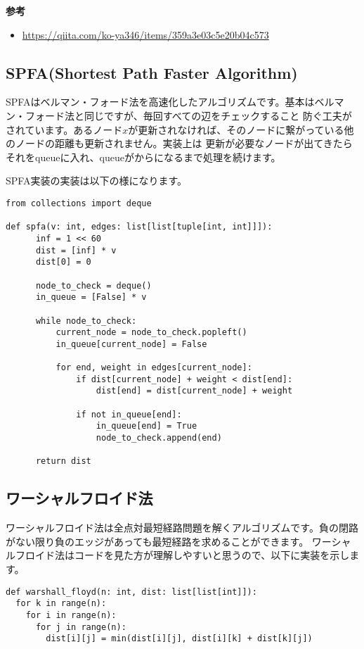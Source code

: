 \documentclass{jlreq}
\begin{document}
\textbf{参考}

\begin{itemize}
  \item \url{https://qiita.com/ko-ya346/items/359a3e03c5e20b04c573}
\end{itemize}

\newpage

\subsection{SPFA(Shortest Path Faster Algorithm)}
SPFAはベルマン・フォード法を高速化したアルゴリズムです。基本はベルマン・フォード法と同じですが、毎回すべての辺をチェックすること
防ぐ工夫がされています。あるノード$x$が更新されなければ、そのノードに繋がっている他のノードの距離も更新されません。実装上は
更新が必要なノードが出てきたらそれをqueueに入れ、queueがからになるまで処理を続けます。

SPFA実装の実装は以下の様になります。

\begin{lstlisting}[caption=SPFAの実装, label=spfa, frame=TRBL, label={spfa}]
from collections import deque

def spfa(v: int, edges: list[list[tuple[int, int]]]):
      inf = 1 << 60
      dist = [inf] * v
      dist[0] = 0
      
      node_to_check = deque()
      in_queue = [False] * v
      
      while node_to_check:
          current_node = node_to_check.popleft()
          in_queue[current_node] = False
          
          for end, weight in edges[current_node]:
              if dist[current_node] + weight < dist[end]:
                  dist[end] = dist[current_node] + weight 
              
              if not in_queue[end]:
                  in_queue[end] = True
                  node_to_check.append(end)
      
      return dist
\end{lstlisting}

\newpage

\subsection{ワーシャルフロイド法}
ワーシャルフロイド法は全点対最短経路問題を解くアルゴリズムです。負の閉路がない限り負のエッジがあっても最短経路を求めることができます。
ワーシャルフロイド法はコードを見た方が理解しやすいと思うので、以下に実装を示します。
\begin{lstlisting}[caption=ワーシャルフロイド法の実装, label=warshall, frame=TRBL, label={warshall}]
def warshall_floyd(n: int, dist: list[list[int]]):
  for k in range(n):
    for i in range(n):
      for j in range(n):
        dist[i][j] = min(dist[i][j], dist[i][k] + dist[k][j])

\end{lstlisting}
\end{document}
